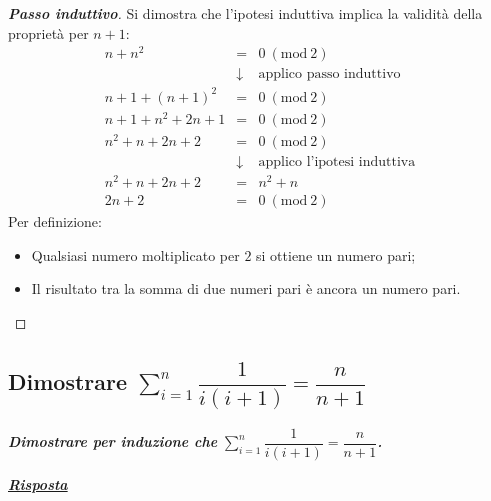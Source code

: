 \documentclass[a4paper]{article}
\begin{document}
	\begin{proof}[\textbf{Passo induttivo}]
		Si dimostra che l'ipotesi induttiva implica la validità della proprietà per $n+1$:
		\begin{equation*}
			\begin{array}{rcl}
				n+n^{2} &=& 0 \: \left(\mathrm{mod} \: 2\right) \\ [.3em]
				&\downarrow& \text{applico passo induttivo} \\ [.3em]    
				n+1 + \left(n+1\right)^{2} &=& 0 \: \left(\mathrm{mod} \: 2\right) \\ [.3em]
				n + 1 + n^{2} + 2n + 1 &=& 0  \: \left(\mathrm{mod} \: 2\right) \\ [.3em]
				n^{2} + n + 2n + 2 &=& 0 \: \left(\mathrm{mod} \: 2\right) \\ [.3em]
				&\downarrow& \text{applico l'ipotesi induttiva} \\ [.3em]
				n^{2} + n + 2n + 2 &=& n^{2} + n \\ [.3em]
				2n + 2 &=& 0 \: \left(\mathrm{mod} \: 2\right)
			\end{array}
		\end{equation*}
		Per definizione:
		\begin{itemize}
			\item Qualsiasi numero moltiplicato per $2$ si ottiene un numero pari;
			\item Il risultato tra la somma di due numeri pari è ancora un numero pari.
		\end{itemize}
	\end{proof}\newpage
	
	\subsection{Dimostrare $\displaystyle\sum_{i=1}^{n}\dfrac{1}{i\left(i+1\right)} = \dfrac{n}{n+1}$}
	\textcolor{Red3}{\textbf{\emph{Dimostrare per induzione che }}$\displaystyle\sum_{i=1}^{n}\dfrac{1}{i\left(i+1\right)} = \dfrac{n}{n+1}$\textbf{\emph{.}}}\newline
	
	\noindent
	\textcolor{Green4}{\textbf{\emph{\underline{Risposta}}}}\newline
	
\end{document}
